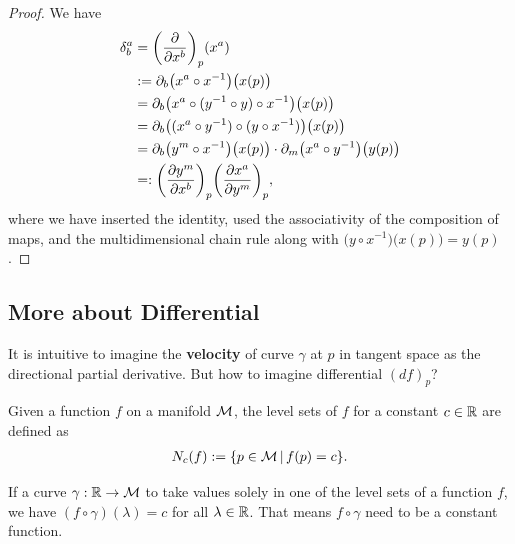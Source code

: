 \documentclass[12pt]{article} %
\begin{document}
\begin{proof}
 We have 
\begin{align*} 
    \begin{split}
        \delta^a_b & = \bigg(\frac{\partial}{\partial x^b}\bigg)_p(x^a) \\
        & := \partial_b\big(x^a\circ x^{-1}\big)\big(x(p)\big) \\
        & = \partial_b\big(x^a\circ (y^{-1}\circ y) \circ x^{-1}\big)\big(x(p)\big) \\
        & = \partial_b\big((x^a\circ y^{-1}) \circ (y \circ x^{-1})\big)\big(x(p)\big) \\
        & = \partial_b\big(y^m\circ x^{-1}\big)\big(x(p)\big) \cdot \partial_m\big(x^a\circ y^{-1}\big) \big(y(p)\big) \\
        & =:  \bigg(\frac{\partial y^m}{\partial x^b}\bigg)_p \bigg(\frac{\partial x^a}{\partial y^m}\bigg)_p,
    \end{split}
\end{align*} 
where we have inserted the identity, used the associativity of the composition of maps, and the multidimensional chain rule along with $\big(y\circ x^{-1}\big)\big(x(p)\big) = y(p)$.  
\end{proof}
\subsection{More about Differential}
It is intuitive to imagine the \textbf{velocity} of curve $\gamma$ at $p$ in tangent space as the directional partial derivative. But how to imagine differential $(df)_p$?

Given a function $f$ on a manifold $\mathcal{M}$, the level sets of $f$ for a constant $c\in\mathbb{R}$ are defined as 
\begin{align*}
    N_c(f) := \{p\in\mathcal{M} \, | \, f(p) = c\}. 
\end{align*} 
\begin{rema}
If a curve $\gamma:\mathbb{R}\to\mathcal{M}$ to take values solely in one of the level sets of a function $f$,
we have $(f\circ \gamma)(\lambda)=c$ for all $\lambda\in\mathbb{R}$. That means $f\circ \gamma$ need to be a constant function.
\end{rema} 
\end{document}
